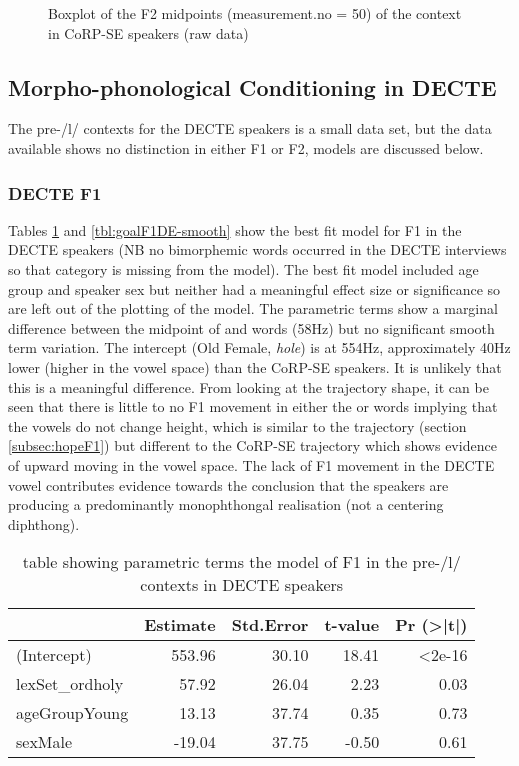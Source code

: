 \documentclass[../../../00.FullDoc/tex/Thesis]{subfiles}
\begin{document}
\begin{center}
	\begin{figure}[h]
		
		\caption{Boxplot of the F2 midpoints (measurement.no = 50) of the \goal{} context in CoRP-SE speakers (raw data)} \label{fig:goalF2SE-boxplot}
	\end{figure}
\end{center}




\subsection{Morpho-phonological Conditioning in DECTE}
The pre-/l/ contexts for the DECTE speakers is a small data set, but the data available shows no distinction in either F1 or F2, models are discussed below.

\subsubsection{DECTE F1}
Tables \ref{tbl:goalF1DE-para} and \ref{tbl:goalF1DE-smooth} show the best fit model for F1 in the DECTE speakers (NB no bimorphemic words occurred in the DECTE interviews so that category is missing from the model). The best fit model included age group and speaker sex but neither had a meaningful effect size or significance so are left out of the plotting of the model. The parametric terms show a marginal difference between the midpoint of \hope{} and \hole{} words (58Hz) but no significant smooth term variation. The intercept (Old Female, \textit{hole}) is at 554Hz, approximately 40Hz lower (higher in the vowel space) than the CoRP-SE speakers. It is unlikely that this is a meaningful difference.
From looking at the trajectory shape, it can be seen that there is little to no F1 movement in either the \hole{} or \holy{} words implying that the vowels do not change height, which is similar to the \hope{} trajectory (section \ref{subsec:hopeF1}) but different to the CoRP-SE trajectory which shows evidence of upward moving in the vowel space. The lack of F1 movement in the DECTE vowel contributes evidence towards the conclusion that the speakers are producing a predominantly monophthongal realisation (not a centering diphthong).

\begin{table}[htbp]
	\centering
	\begin{tabular}{lrrrr}
		\hline
		& Estimate & Std.Error & t-value & Pr (>|t|) \\
		\hline   
		(Intercept) & 553.96 & 30.10 & 18.41 & <2e-16 \\
		lexSet\_ordholy & 57.92 & 26.04 & 2.23 & 0.03 \\
		ageGroupYoung & 13.13 & 37.74 & 0.35 & 0.73 \\
		sexMale & -19.04 & 37.75 & -0.50 & 0.61 \\
		\hline
	\end{tabular}%
	\caption{table showing parametric terms the model of F1 in the pre-/l/ contexts in DECTE speakers}
	\label{tbl:goalF1DE-para}%
\end{table}%
\end{document}
